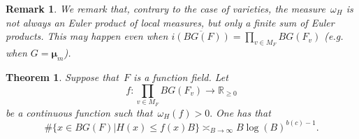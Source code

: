\documentclass[a4paper,english,12pt]{amsart}
\newcommand{\RR}{\mathbb{R}}
\newcommand{\vMF}{v\in M_F}
\newcommand{\muu}{\boldsymbol{\mu}}
\newtheorem{thm}[equation]{Theorem}
\newtheorem{rem}[equation]{Remark}
\numberwithin{equation}{subsection}
\begin{document}
\begin{rem}
\normalfont We remark that, contrary to the case of varieties,  the measure~$\omega_H$ is not always an Euler product of local measures, but only a finite sum of Euler products. This may happen even when $\overline{i(BG(F))}=\prod_{\vMF}BG(F_v)$ (e.g. when $G=\muu_m$). 
\end{rem}
\begin{thm}\label{satfunf}
Suppose that~$F$ is a function field. Let $$f:\prod_{\vMF}BG(F_v)\to \RR_{\geq 0}$$ be a continuous function such that~$\omega_H(f)> 0.$ %
One has that $$\#\{x\in BG(F)|H(x)\leq f(x)B\}\asymp_{B\to\infty} B\log(B)^{b(c)-1}.$$
\end{thm}
\end{document}
